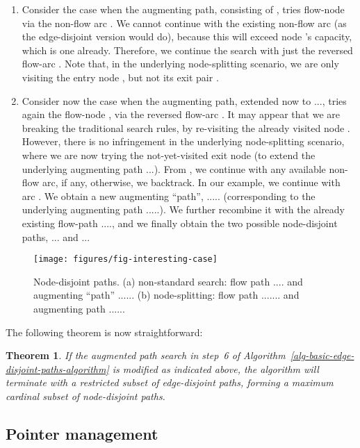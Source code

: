 \documentclass[preliminary,copyright,creativecommons]{eptcs}
\newtheorem{theorem}{Theorem}
\theoremstyle{remark}
\begin{document}
\begin{enumerate}
\item Consider the case when the augmenting path, consisting of ,
tries flow-node  via the non-flow arc .
We cannot continue with the existing non-flow arc 
(as the edge-disjoint version would do), 
because this will exceed node 's capacity, which is one already.
Therefore, we continue the search 
with just the reversed flow-arc .
Note that, in the underlying node-splitting scenario,
we are only visiting the entry node , but not its exit pair . 

\item Consider now the case when the augmenting path, extended now to ...,
tries again the flow-node , via the reversed flow-arc .
It may appear that we are breaking the traditional search rules,
by re-visiting the already visited node .
However, there is no infringement in the underlying node-splitting scenario,
where we are now trying the not-yet-visited exit node 
(to extend the underlying augmenting path ...).
From , we continue with any available non-flow arc, if any, 
otherwise, we backtrack. In our example, we continue with arc .
We obtain a new augmenting ``path'', .....
(corresponding to the underlying augmenting path .....).
We further recombine it with the already existing flow-path ....,
and we finally obtain the two possible node-disjoint paths,
... and ...
\end{enumerate}

\begin{figure}[h]
\centerline{\texttt{[image: figures/fig-interesting-case]}}
\caption{Node-disjoint paths.
(a) non-standard search: flow path .... and augmenting ``path'' ......
(b) node-splitting: flow path ....... and 
augmenting path ......
}
\label{fig-interesting-case}
\end{figure}

The following theorem is now straightforward:

\begin{theorem}
If the augmented path search in step~6 of Algorithm~\ref{alg-basic-edge-disjoint-paths-algorithm} is modified as indicated above,
the algorithm will terminate with a restricted subset of edge-disjoint paths,
forming a maximum cardinal subset of node-disjoint paths.
\end{theorem}


\subsection{Pointer management}
\label{sec-pointer-management}
\end{document}
